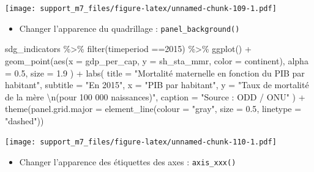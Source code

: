 \documentclass[
]{book}
\newenvironment{Shaded}{\begin{snugshade}}{\end{snugshade}}
\newcommand{\AttributeTok}[1]{\textcolor[rgb]{0.77,0.63,0.00}{#1}}
\newcommand{\DecValTok}[1]{\textcolor[rgb]{0.00,0.00,0.81}{#1}}
\newcommand{\FloatTok}[1]{\textcolor[rgb]{0.00,0.00,0.81}{#1}}
\newcommand{\FunctionTok}[1]{\textcolor[rgb]{0.00,0.00,0.00}{#1}}
\newcommand{\NormalTok}[1]{#1}
\newcommand{\SpecialCharTok}[1]{\textcolor[rgb]{0.00,0.00,0.00}{#1}}
\newcommand{\StringTok}[1]{\textcolor[rgb]{0.31,0.60,0.02}{#1}}
\providecommand{\tightlist}{%
  \setlength{\itemsep}{0pt}\setlength{\parskip}{0pt}}
\begin{document}
\texttt{[image: support\_m7\_files/figure-latex/unnamed-chunk-109-1.pdf]}

\begin{itemize}
\tightlist
\item
  Changer l'apparence du quadrillage : \texttt{panel\_background()}
\end{itemize}

\begin{Shaded}
\begin{Highlighting}[]
\NormalTok{sdg\_indicators }\SpecialCharTok{\%\textgreater{}\%} 
  \FunctionTok{filter}\NormalTok{(timeperiod }\SpecialCharTok{==}\DecValTok{2015}\NormalTok{) }\SpecialCharTok{\%\textgreater{}\%} 
  \FunctionTok{ggplot}\NormalTok{() }\SpecialCharTok{+}
  \FunctionTok{geom\_point}\NormalTok{(}\FunctionTok{aes}\NormalTok{(}\AttributeTok{x =}\NormalTok{ gdp\_per\_cap, }
                 \AttributeTok{y =}\NormalTok{ sh\_sta\_mmr,}
                 \AttributeTok{color =}\NormalTok{ continent),}
    \AttributeTok{alpha =} \FloatTok{0.5}\NormalTok{, }
    \AttributeTok{size =} \FloatTok{1.9}
\NormalTok{  ) }\SpecialCharTok{+}
  \FunctionTok{labs}\NormalTok{(}
    \AttributeTok{title =} \StringTok{"Mortalité maternelle en fonction du PIB par habitant"}\NormalTok{,}
    \AttributeTok{subtitle =} \StringTok{"En 2015"}\NormalTok{,}
    \AttributeTok{x =} \StringTok{"PIB par habitant"}\NormalTok{,}
    \AttributeTok{y =} \StringTok{"Taux de mortalité de la mère }\SpecialCharTok{\textbackslash{}n}\StringTok{(pour 100 000 naissances)"}\NormalTok{,}
    \AttributeTok{caption =} \StringTok{"Source : ODD / ONU"}
\NormalTok{  ) }\SpecialCharTok{+}
  \FunctionTok{theme}\NormalTok{(}\AttributeTok{panel.grid.major =} \FunctionTok{element\_line}\NormalTok{(}\AttributeTok{colour =} \StringTok{"gray"}\NormalTok{, }\AttributeTok{size =} \FloatTok{0.5}\NormalTok{, }\AttributeTok{linetype =} \StringTok{"dashed"}\NormalTok{))}
\end{Highlighting}
\end{Shaded}

\texttt{[image: support\_m7\_files/figure-latex/unnamed-chunk-110-1.pdf]}

\begin{itemize}
\tightlist
\item
  Changer l'apparence des étiquettes des axes : \texttt{axis\_xxx()}
\end{itemize}
\end{document}
